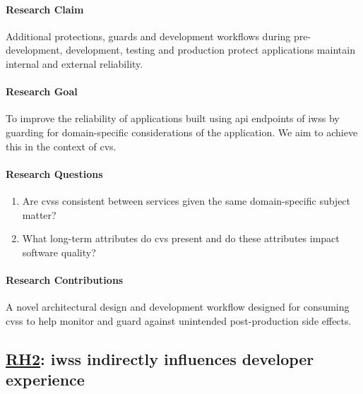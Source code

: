 \paragraph{Research Claim}
Additional protections, guards and development workflows during pre-development, development, testing and production protect applications maintain internal and external reliability.

\paragraph{Research Goal}
To improve the reliability of applications built using \gls{api} endpoints of \glspl{iws} by guarding for domain-specific considerations of the application. We aim to achieve this in the context of \gls{cvs}.

\paragraph{Research Questions}
\begin{enumerate}[label=\textbf{RQ2.\arabic*.}, ref=RQ1.\arabic*, leftmargin=3.5\parindent, rightmargin=1\parindent]
  \item Are \glspl{cvs} consistent between services given the same domain-specific subject matter?
  \item What long-term attributes do \gls{cvs} present and do these attributes impact software quality?
\end{enumerate}

\paragraph{Research Contributions} A novel architectural design and development workflow designed for consuming \glspl{cvs} to help monitor and guard against unintended post-production side effects.

\subsection[Research Hypothesis 2]{\underline{RH2}: \glspl{iws} indirectly influences developer experience}
\label{rh2}



